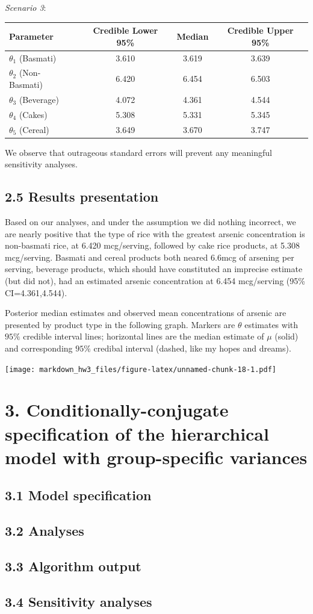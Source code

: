 \documentclass[]{article}
\begin{document}
\textit{Scenario 3}:

\begin{center}
  \begin{tabular}{l c c c}
  \hline Parameter & Credible Lower 95\% & Median & Credible Upper 95\%  \\ \hline
    $\theta_1$ (Basmati) & 3.610 & 3.619 & 3.639 \\ 
    $\theta_2$ (Non-Basmati) & 6.420 & 6.454 & 6.503 \\
    $\theta_3$ (Beverage) & 4.072 & 4.361 & 4.544 \\
    $\theta_4$ (Cakes) & 5.308 & 5.331 & 5.345 \\
    $\theta_5$ (Cereal) & 3.649 & 3.670 & 3.747 \\ \hline
  \end{tabular}
\end{center}

We observe that outrageous standard errors will prevent any meaningful
sensitivity analyses.

\subsection{2.5 Results presentation}

Based on our analyses, and under the assumption we did nothing
incorrect, we are nearly positive that the type of rice with the
greatest arsenic concentration is non-basmati rice, at 6.420
mcg/serving, followed by cake rice products, at 5.308 mcg/serving.
Basmati and cereal products both neared 6.6mcg of arsening per serving,
beverage products, which should have constituted an imprecise estimate
(but did not), had an estimated arsenic concentration at 6.454
mcg/serving (95\% CI=4.361,4.544).

Posterior median estimates and observed mean concentrations of arsenic
are presented by product type in the following graph. Markers are
\(\theta\) estimates with \(95\%\) credible interval lines; horizontal
lines are the median estimate of \(\mu\) (solid) and corresponding
\(95\%\) credibal interval (dashed, like my hopes and dreams).

\texttt{[image: markdown\_hw3\_files/figure-latex/unnamed-chunk-18-1.pdf]}
\newpage \section{3. Conditionally-conjugate specification of the hierarchical model with group-specific variances}
\subsection{3.1 Model specification} \subsection{3.2 Analyses}
\subsection{3.3 Algorithm output} \subsection{3.4 Sensitivity analyses}
\end{document}
